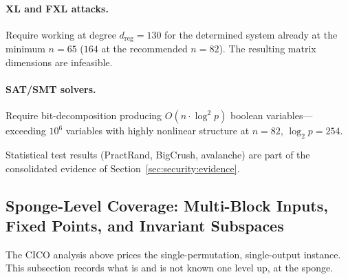 \documentclass[11pt,a4paper]{article}
\theoremstyle{definition}
\begin{document}
\paragraph{XL and FXL attacks.}
Require working at degree $d_{\mathrm{reg}} = 130$ for the
determined system already at the minimum $n=65$ ($164$ at the
recommended $n=82$). The resulting matrix dimensions are infeasible.

\paragraph{SAT/SMT solvers.}
Require bit-decomposition producing $O(n \cdot \log^2 p)$ boolean
variables---exceeding $10^6$ variables with highly nonlinear structure at
$n=82$, $\log_2 p = 254$.


Statistical test results (PractRand, BigCrush, avalanche) are part
of the consolidated evidence of Section~\ref{sec:security:evidence}.


\subsection{Sponge-Level Coverage: Multi-Block Inputs, Fixed Points,
and Invariant Subspaces}\label{sec:security:spongelevel}

The CICO analysis above prices the single-permutation, single-output
instance. This subsection records what is and is not known one level
up, at the sponge.
\end{document}

